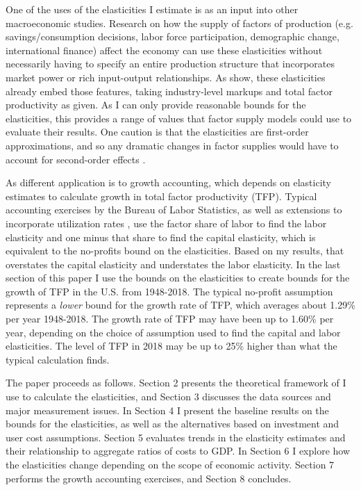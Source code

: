\documentclass[11pt]{article}
\begin{document}
One of the uses of the elasticities I estimate is as an input into other macroeconomic studies. Research on how the supply of factors of production (e.g. savings/consumption decisions, labor force participation, demographic change, international finance) affect the economy can use these elasticities without necessarily having to specify an entire production structure that incorporates market power or rich input-output relationships. As \cite{bfshortnote,bfprodge} show, these elasticities already embed those features, taking industry-level markups and total factor productivity as given. As I can only provide reasonable bounds for the elasticities, this provides a range of values that factor supply models could use to evaluate their results. One caution is that the elasticities are first-order approximations, and so any dramatic changes in factor supplies would have to account for second-order effects \citep{bfmicro}. 

As different application is to growth accounting, which depends on elasticity estimates to calculate growth in total factor productivity (TFP). Typical accounting exercises by the Bureau of Labor Statistics, as well as extensions to incorporate utilization rates \citep{kfb2006,fernald2014}, use the factor share of labor to find the labor elasticity and one minus that share to find the capital elasticity, which is equivalent to the no-profits bound on the elasticities. Based on my results, that overstates the capital elasticity and understates the labor elasticity. In the last section of this paper I use the bounds on the elasticities to create bounds for the growth of TFP in the U.S. from 1948-2018. The typical no-profit assumption represents a \textit{lower} bound for the growth rate of TFP, which averages about 1.29\% per year 1948-2018. The growth rate of TFP may have been up to 1.60\% per year, depending on the choice of assumption used to find the capital and labor elasticities. The level of TFP in 2018 may be up to 25\% higher than what the typical calculation finds. 

The paper proceeds as follows. Section 2 presents the theoretical framework of \cite{bfshortnote,bfprodge} I use to calculate the elasticities, and Section 3 discusses the data sources and major measurement issues. In Section 4 I present the baseline results on the bounds for the elasticities, as well as the alternatives based on investment and user cost assumptions. Section 5 evaluates trends in the elasticity estimates and their relationship to aggregate ratios of costs to GDP. In Section 6 I explore how the elasticities change depending on the scope of economic activity. Section 7 performs the growth accounting exercises, and Section 8 concludes.
\end{document}
